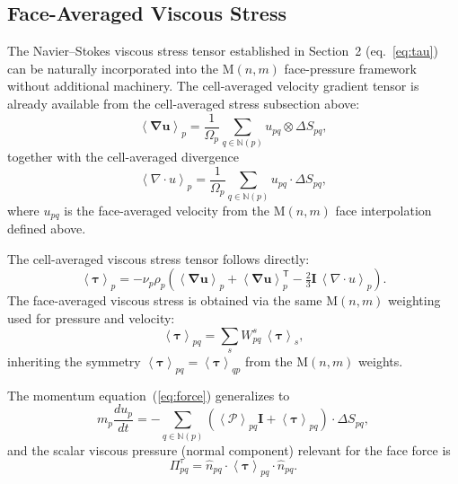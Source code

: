 \documentclass[twocolumn]{aastex63}
\newcommand{\vel}{{u}}
\newcommand{\surf}[0]{S}
\newcommand{\gradT}[1]{\boldsymbol{\nabla#1}}
\newcommand{\pressure}[0]{\mathcal{P}}
\begin{document}
\subsection{Face-Averaged Viscous Stress}
\label{sec:facetau}

The Navier--Stokes viscous stress tensor established
in Section~2 (eq.~\ref{eq:tau}) can be naturally
incorporated into the M$(n,m)$ face-pressure framework
without additional machinery.
The cell-averaged velocity gradient tensor is already
available from the cell-averaged stress subsection above:
\begin{equation}\label{eq:gradv_cell}
  \left<\gradT{u}\right>_p
  = \frac{1}{\Omega_p}
    \sum_{q\in\mathbb{N}(p)}
      \vel_{pq}\otimes\Delta\surf_{pq},
\end{equation}
together with the cell-averaged divergence
\begin{equation}\label{eq:divv_cell}
  \left<\nabla\!\cdot\!\vel\right>_p
  = \frac{1}{\Omega_p}
    \sum_{q\in\mathbb{N}(p)}
      \vel_{pq}\cdot\Delta\surf_{pq},
\end{equation}
where $\vel_{pq}$ is the face-averaged velocity from
the M$(n,m)$ face interpolation defined above.

The cell-averaged viscous stress tensor follows directly:
\begin{equation}\label{eq:tau_cell}
  \left<\boldsymbol{\tau}\right>_p
  = -\nu_p\rho_p\left(
    \left<\gradT{u}\right>_p
    + \left<\gradT{u}\right>_p^\mathsf{T}
    - \tfrac{2}{3}\boldsymbol{I}\,
      \left<\nabla\!\cdot\!\vel\right>_p
  \right).
\end{equation}
The face-averaged viscous stress is obtained via the
same M$(n,m)$ weighting used for pressure and velocity:
\begin{equation}\label{eq:tau_face}
  \left<\boldsymbol{\tau}\right>_{pq}
  = \sum_{s} W^s_{pq}\,
    \left<\boldsymbol{\tau}\right>_s,
\end{equation}
inheriting the symmetry
$\left<\boldsymbol{\tau}\right>_{pq}
 = \left<\boldsymbol{\tau}\right>_{qp}$
from the M$(n,m)$ weights.

The momentum equation~(\ref{eq:force}) generalizes to
\begin{equation}\label{eq:mom_tau}
  m_p\frac{d\vel_p}{dt}
  = -\sum_{q\in\mathbb{N}(p)}
    \left(
      \left<\pressure\right>_{pq}\boldsymbol{I}
      + \left<\boldsymbol{\tau}\right>_{pq}
    \right)\cdot\Delta\surf_{pq},
\end{equation}
and the scalar viscous pressure (normal component)
relevant for the face force is
\begin{equation}\label{eq:pi_tau}
  \Pi_{pq}^{\tau}
  = \hat{n}_{pq}\cdot
    \left<\boldsymbol{\tau}\right>_{pq}
    \cdot\hat{n}_{pq}.
\end{equation}
\end{document}
